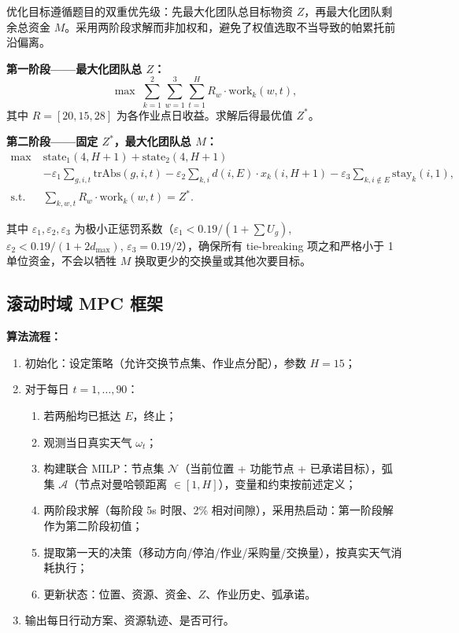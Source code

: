 优化目标遵循题目的双重优先级：先最大化团队总目标物资 $Z$，再最大化团队剩余总资金 $M$。采用两阶段求解而非加权和，避免了权值选取不当导致的帕累托前沿偏离。

\textbf{第一阶段——最大化团队总 $Z$：}
\begin{equation}\label{eq:q4_stage1}
\max\; \sum_{k=1}^{2}\sum_{w=1}^{3}\sum_{t=1}^{H} R_w \cdot \text{work}_k(w,t),
\end{equation}
其中 $R=[20,15,28]$ 为各作业点日收益。求解后得最优值 $Z^*$。

\textbf{第二阶段——固定 $Z^*$，最大化团队总 $M$：}
\begin{equation}\label{eq:q4_stage2}
\begin{aligned}
\max\; &\text{state}_1(4, H+1) + \text{state}_2(4, H+1) \\
       &- \varepsilon_1\sum_{g,i,t}\text{trAbs}(g,i,t)
        - \varepsilon_2\sum_{k,i} d(i,E)\cdot x_k(i,H+1)
        - \varepsilon_3\sum_{k,i\notin E}\text{stay}_k(i,1),\\
\text{s.t.}\;& \sum_{k,w,t} R_w\cdot \text{work}_k(w,t) = Z^*.
\end{aligned}
\end{equation}

其中 $\varepsilon_1,\varepsilon_2,\varepsilon_3$ 为极小正惩罚系数（$\varepsilon_1<0.19/(1+\sum U_g)$, $\varepsilon_2<0.19/(1+2d_{\max})$, $\varepsilon_3=0.19/2$），确保所有 tie-breaking 项之和严格小于 1 单位资金，不会以牺牲 $M$ 换取更少的交换量或其他次要目标。

\subsection{滚动时域 MPC 框架}

\textbf{算法流程：}

\begin{enumerate}
    \item 初始化：设定策略（允许交换节点集、作业点分配），参数 $H=15$；
    \item 对于每日 $t=1,\dots,90$：
    \begin{enumerate}
        \item 若两船均已抵达 $E$，终止；
        \item 观测当日真实天气 $\omega_t$；
        \item 构建联合 MILP：节点集 $\mathcal{N}$（当前位置 + 功能节点 + 已承诺目标），弧集 $\mathcal{A}$（节点对曼哈顿距离 $\in[1,H]$），变量和约束按前述定义；
        \item 两阶段求解（每阶段 5s 时限、2\% 相对间隙），采用热启动：第一阶段解作为第二阶段初值；
        \item 提取第一天的决策（移动方向/停泊/作业/采购量/交换量），按真实天气消耗执行；
        \item 更新状态：位置、资源、资金、$Z$、作业历史、弧承诺。
    \end{enumerate}
    \item 输出每日行动方案、资源轨迹、是否可行。
\end{enumerate}

